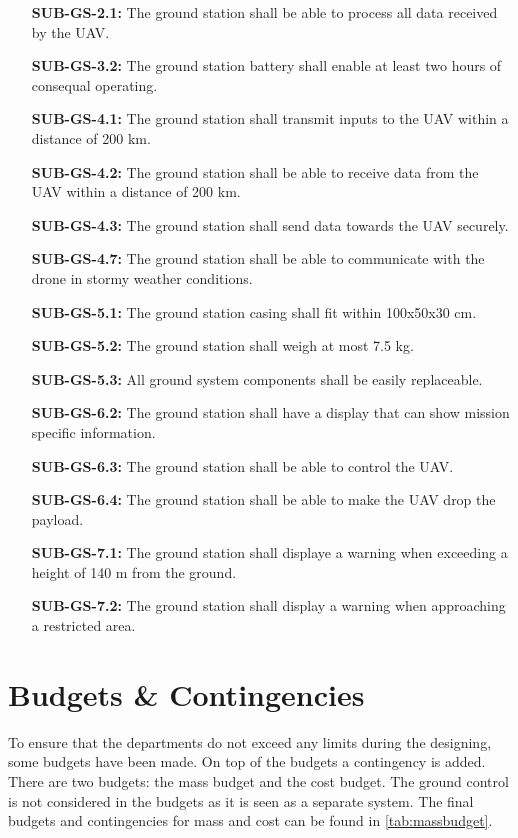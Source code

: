 \begin{enumerate}[leftmargin =3.5cm, align=parleft, labelwidth=8em]
    \item[\textbf{SUB-GS-2.1:}] The ground station shall be able to process all data received by the UAV. 
    \item[\textbf{SUB-GS-3.2:}] The ground station battery shall enable at least two hours of consequal operating.
    \item[\textbf{SUB-GS-4.1:}] The ground station shall transmit inputs to the UAV within a distance of 200 km.
    \item[\textbf{SUB-GS-4.2:}] The ground station shall be able to receive data from the UAV within a distance of 200 km.
    \item[\textbf{SUB-GS-4.3:}] The ground station shall send data towards the UAV securely.
    \item[\textbf{SUB-GS-4.7:}] The ground station shall be able to communicate with the drone in stormy weather conditions.
    \item[\textbf{SUB-GS-5.1:}] The ground station casing shall fit within 100x50x30 cm.
    \item[\textbf{SUB-GS-5.2:}] The ground station shall weigh at most 7.5 kg.
    \item[\textbf{SUB-GS-5.3:}] All ground system components shall be easily replaceable.
    \item[\textbf{SUB-GS-6.2:}] The ground station shall have a display that can show mission specific information.
    \item[\textbf{SUB-GS-6.3:}] The ground station shall be able to control the UAV.
    \item[\textbf{SUB-GS-6.4:}] The ground station shall be able to make the UAV drop the payload.
    \item[\textbf{SUB-GS-7.1:}] The ground station shall displaye a warning when exceeding a height of 140 m from the ground.
    \item[\textbf{SUB-GS-7.2:}] The ground station shall display a warning when approaching a restricted area.
\end{enumerate}




\section{Budgets \& Contingencies}
\label{sec:budg_cont}
To ensure that the departments do not exceed any limits during the designing, some budgets have been made. On top of the budgets a contingency is added. There are two budgets: the mass budget and the cost budget. The ground control is not considered in the budgets as it is seen as a separate system. The final budgets and contingencies for mass and cost can be found in \autoref{tab:massbudget}. 

